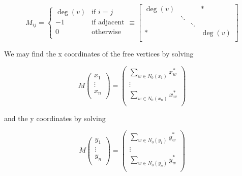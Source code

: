 \documentclass[11pt]{report}
\begin{document}
\begin{equation}\label{eqn:barycenter_matrix}
    M_{ij} = \begin{cases}
    \deg(v) &{\text{if $i = j$}} \\
    -1      &{\text{if adjacent}} \\
    0       &{\text{otherwise}} \\
    \end{cases}
    \equiv
    \begin{bmatrix}
    \deg(v) &        &        & * \\
            & \ddots &        & \\
            &        & \ddots & \\
    *       &        &        & \deg(v) \\
    \end{bmatrix}
\end{equation}

We may find the x coordinates of the free vertices by solving

\begin{equation}\label{eqn:barycenter_matrix_x}
    M \begin{pmatrix}
        x_1 \\ \vdots \\ x_n \\
    \end{pmatrix} =
    \begin{pmatrix}
        \sum_{w \in N_0(x_1)} x^*_w \\
        \vdots \\
        \sum_{w \in N_0(x_n)} x^*_w \\
    \end{pmatrix}
\end{equation}

and the y coordinates by solving

\begin{equation}\label{eqn:barycenter_matrix_y}
    M \begin{pmatrix}
       y_1 \\ \vdots \\ y_n \\
    \end{pmatrix} =
    \begin{pmatrix}
        \sum_{w \in N_0(y_1)} y^*_w \\
        \vdots \\
        \sum_{w \in N_0(y_n)} y^*_w \\
    \end{pmatrix}
\end{equation}
\end{document}
